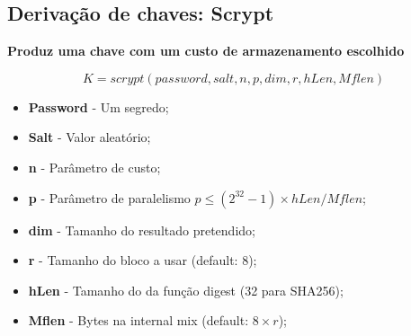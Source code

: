 \documentclass{article}
\begin{document}
\pagebreak

\subsection{Derivação de chaves: Scrypt}

\begin{flushleft}
  \textbf{Produz uma chave com um custo de armazenamento escolhido}

  \vspace{2mm}

  \[ K = scrypt(password, salt, n, p, dim, r, hLen, Mflen) \]

  \begin{itemize}
    \item \textbf{Password} - Um segredo;
    \item \textbf{Salt} - Valor aleatório;
    \item \textbf{n} - Parâmetro de custo;
    \item \textbf{p} - Parâmetro de paralelismo $p \le (2^{32} -1) \times hLen / Mflen$;
    \item \textbf{dim} - Tamanho do resultado pretendido;
    \item \textbf{r} - Tamanho do bloco a usar (default: 8);
    \item \textbf{hLen} - Tamanho do da função digest (32 para SHA256);
    \item \textbf{Mflen} - Bytes na internal mix (default: $8 \times r$);
  \end{itemize}
\end{flushleft}
\end{document}
